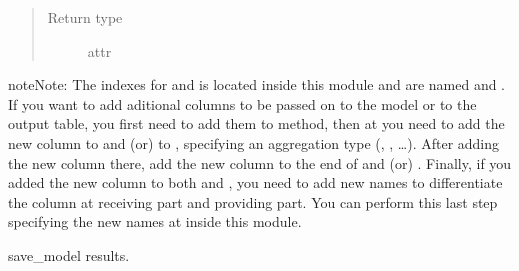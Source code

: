 \documentclass[letterpaper,10pt,english]{sphinxmanual}
\begin{document}
\begin{fulllineitems}
\begin{fulllineitems}
\begin{quote}
\begin{description}
\item[{Return type}] \leavevmode
attr

\end{description}\end{quote}

\begin{sphinxadmonition}{note}{Note:}
The indexes for  and  is located inside this module and are named  and .         If you want to add aditional columns to be passed on to the model or to the output table, you first need to add them to         {\hyperref[\detokenize{source/optimization.datatools:optimization.datatools.pipelines.data_pipeline}]{}} method, then at         {\hyperref[\detokenize{source/optimization:optimization.solspace.SolutionSpace}]{}}  you need to add the new column to          and (or) to , specifying an aggregation type (, , …). After adding the new column there, add the new column         to the end of  and (or) . Finally, if you added the new column to both  and ,         you need to add new names to differentiate the column at receiving part and providing part. You can perform this last step specifying the new names at          inside this module.
\end{sphinxadmonition}

\end{fulllineitems}


\begin{fulllineitems}
\label{\detokenize{source/optimization.model:optimization.model.optimizer.OptimizationModel.save_model}}
save\_model results.


\end{fulllineitems}
\end{fulllineitems}
\end{document}
